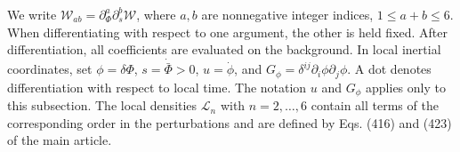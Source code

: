 \documentclass[11pt,a4paper]{article}
\begin{document}
We write $ \mathcal W_{ab}=\partial_\Phi^a\partial_s^b\mathcal W $, where $ a,b $ are nonnegative integer indices, $ 1\leq a+b\leq6 $. When differentiating with respect to one argument, the other is held fixed. After differentiation, all coefficients are evaluated on the background. In local inertial coordinates, set $ \phi=\delta\Phi $, $ s=\dot{\bar\Phi}>0 $, $ u=\dot\phi $, and $ G_\phi=\delta^{ij}\partial_i\phi\partial_j\phi $. A dot denotes differentiation with respect to local time. The notation $ u $ and $ G_\phi $ applies only to this subsection. The local densities $ \mathcal L_n $ with $ n=2,\ldots,6 $ contain all terms of the corresponding order in the perturbations and are defined by Eqs. (416) and (423) of the main article.
\end{document}
